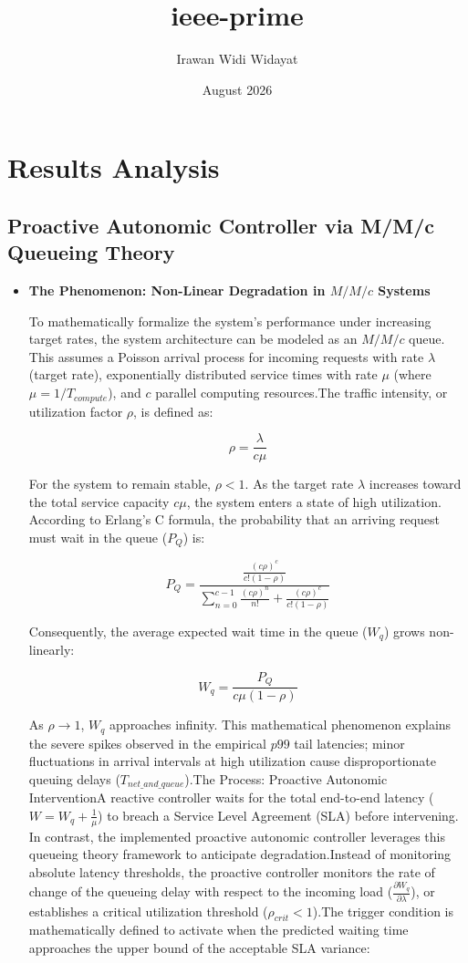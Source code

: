 \documentclass{article}
\title{ieee-prime}
\author{Irawan Widi Widayat}
\date{August 2026}
\begin{document}
\maketitle

\section{Results Analysis}
\subsection{Proactive Autonomic Controller via M/M/c Queueing Theory} 

\begin{itemize}
    \item \textbf{The Phenomenon: Non-Linear Degradation in $M/M/c$ Systems}  

To mathematically formalize the system's performance under increasing target rates, the system architecture can be modeled as an $M/M/c$ queue. This assumes a Poisson arrival process for incoming requests with rate $\lambda$ (target rate), exponentially distributed service times with rate $\mu$ (where $\mu = 1 / T_{compute}$), and $c$ parallel computing resources.The traffic intensity, or utilization factor $\rho$, is defined as:

$$\rho = \frac{\lambda}{c\mu}$$

For the system to remain stable, $\rho < 1$. As the target rate $\lambda$ increases toward the total service capacity $c\mu$, the system enters a state of high utilization. According to Erlang's C formula, the probability that an arriving request must wait in the queue ($P_Q$) is:

$$P_Q = \frac{\frac{(c\rho)^c}{c!(1-\rho)}}{\sum_{n=0}^{c-1} \frac{(c\rho)^n}{n!} + \frac{(c\rho)^c}{c!(1-\rho)}}$$

Consequently, the average expected wait time in the queue ($W_q$) grows non-linearly:

$$W_q = \frac{P_Q}{c\mu(1-\rho)}$$

As $\rho \to 1$, $W_q$ approaches infinity. This mathematical phenomenon explains the severe spikes observed in the empirical $p99$ tail latencies; minor fluctuations in arrival intervals at high utilization cause disproportionate queuing delays ($T_{net\_and\_queue}$).The Process: Proactive Autonomic InterventionA reactive controller waits for the total end-to-end latency ($W = W_q + \frac{1}{\mu}$) to breach a Service Level Agreement (SLA) before intervening. In contrast, the implemented proactive autonomic controller leverages this queueing theory framework to anticipate degradation.Instead of monitoring absolute latency thresholds, the proactive controller monitors the rate of change of the queueing delay with respect to the incoming load ($\frac{\partial W_q}{\partial \lambda}$), or establishes a critical utilization threshold ($\rho_{crit} < 1$).The trigger condition is mathematically defined to activate when the predicted waiting time approaches the upper bound of the acceptable SLA variance:


\end{itemize}
\end{document}
